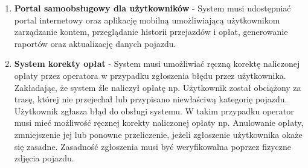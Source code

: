 \begin{enumerate}
    \item \textbf{Portal samoobsługowy dla użytkowników} - System musi udostępniać portal internetowy oraz aplikację mobilną umożliwiającą użytkownikom zarządzanie kontem, przeglądanie historii przejazdów i opłat, generowanie raportów oraz aktualizację danych pojazdu.

    \item \textbf{System korekty opłat} - System musi umożliwiać ręczną korektę naliczonej opłaty przez operatora w przypadku zgłoszenia błędu przez użytkownika. Zakładając, że system źle naliczył opłatę np. Użytkownik został obciążony za trasę, której nie przejechał lub przypisano niewłaściwą kategorię pojazdu. Użytkownik zgłasza błąd do obsługi systemu. W takim przypadku operator musi mieć możliwość ręcznej korekty naliczonej opłaty np. Anulowanie opłaty, zmniejszenie jej lub ponowne przeliczenie, jeżeli zgłoszenie użytkownika okaże się zasadne. Zasadność zgłoszenia musi być weryfikowalna poprzez fizyczne zdjęcia pojazdu.
\end{enumerate}

